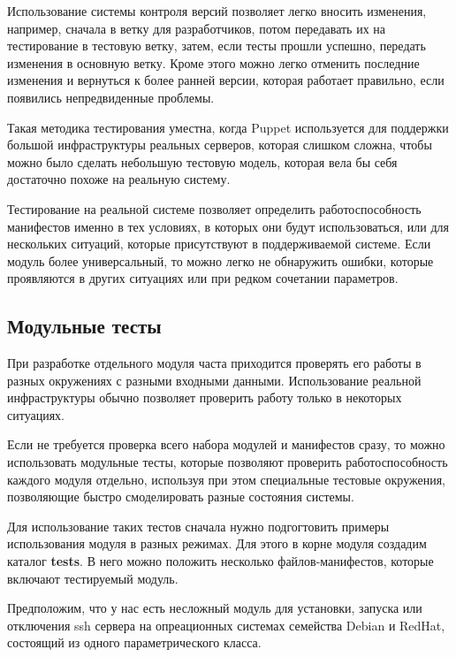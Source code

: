 Использование системы контроля версий позволяет легко вносить изменения, например, сначала в ветку для разработчиков, потом передавать их на тестирование в тестовую ветку, затем, если тесты прошли успешно, передать изменения в основную ветку. Кроме этого можно легко отменить последние изменения и вернуться к более ранней версии, которая работает правильно, если появились непредвиденные проблемы.

Такая методика тестирования уместна, когда Puppet используется для поддержки большой инфраструктуры реальных серверов, которая слишком сложна, чтобы можно было сделать небольшую тестовую модель, которая вела бы себя достаточно похоже на реальную систему.

Тестирование на реальной системе позволяет определить работоспособность манифестов именно в тех условиях, в которых они будут использоваться, или для нескольких ситуаций, которые присутствуют в поддерживаемой системе. Если модуль более универсальный, то можно легко не обнаружить ошибки, которые проявляются в других ситуациях или при редком сочетании параметров.

\subsection{Модульные тесты}

При разработке отдельного модуля часта приходится проверять его работы в разных окружениях с разными входными данными. Использование реальной инфраструктуры обычно позволяет проверить работу только в некоторых ситуациях.

Если не требуется проверка всего набора модулей и манифестов сразу, то можно использовать модульные тесты, которые позволяют проверить работоспособность каждого модуля отдельно, используя при этом специальные тестовые окружения, позволяющие быстро смоделировать разные состояния системы.

Для использование таких тестов сначала нужно подгогтовить примеры использования модуля в разных режимах. Для этого в корне модуля создадим каталог \textbf{tests}. В него можно положить несколько файлов-манифестов, которые включают тестируемый модуль.

Предположим, что у нас есть несложный модуль для установки, запуска или отключения ssh сервера на опреационных системах семейства Debian и RedHat, состоящий из одного параметрического класса.




